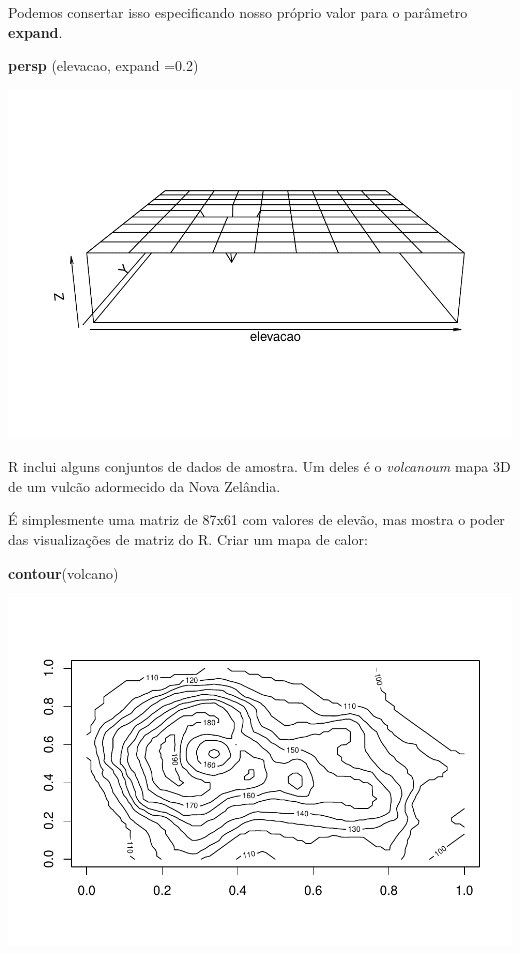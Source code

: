 \documentclass[
]{book}
\newenvironment{Shaded}{\begin{snugshade}}{\end{snugshade}}
\newcommand{\DataTypeTok}[1]{\textcolor[rgb]{0.13,0.29,0.53}{#1}}
\newcommand{\FloatTok}[1]{\textcolor[rgb]{0.00,0.00,0.81}{#1}}
\newcommand{\KeywordTok}[1]{\textcolor[rgb]{0.13,0.29,0.53}{\textbf{#1}}}
\newcommand{\NormalTok}[1]{#1}
\begin{document}
Podemos consertar isso especificando nosso próprio valor para o parâmetro \textbf{expand}.

\begin{Shaded}
\begin{Highlighting}[]
\KeywordTok{persp}\NormalTok{ (elevacao, }\DataTypeTok{expand =}\FloatTok{0.2}\NormalTok{)}
\end{Highlighting}
\end{Shaded}

\includegraphics{TudodoR_files/figure-latex/unnamed-chunk-73-1.pdf}

R inclui alguns conjuntos de dados de amostra. Um deles é o \emph{volcanoum} mapa 3D de um vulcão adormecido da Nova Zelândia.

É simplesmente uma matriz de 87x61 com valores de elevão, mas mostra o poder das visualizações de matriz do R. Criar um mapa de calor:

\begin{Shaded}
\begin{Highlighting}[]
\KeywordTok{contour}\NormalTok{(volcano)}
\end{Highlighting}
\end{Shaded}

\includegraphics{TudodoR_files/figure-latex/unnamed-chunk-74-1.pdf}
\end{document}
